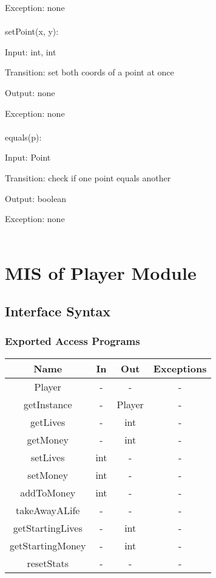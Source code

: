 \documentclass[12,english]{article}
\begin{document}
			Exception: none\\
			\\
			setPoint(x, y):
			
			Input: int, int
			
			Transition: set both coords of a point at once

			Output: none
			
			Exception: none\\
			\\
			equals(p):
			
			Input: Point
			
			Transition: check if one point equals another

			Output: boolean
			
			Exception: none\\
			\\

\section{MIS of Player Module}
		\subsection{Interface Syntax}
			\subsubsection{Exported Access Programs}
				\begin{tabular}[pos]{|c|c|c|c|}
					
					\hline
					\textbf{Name}& \textbf{In} & \textbf{Out} & \textbf{Exceptions} \\ \hline
					Player & - & - & -\\ \hline
					getInstance & - & Player & -\\ \hline
					getLives & - & int & -\\ \hline
					getMoney & - & int & -\\ \hline
					setLives & int & - & -\\ \hline
					setMoney & int & - & - \\ \hline
					addToMoney & int & - & - \\ \hline
					takeAwayALife & - & - & - \\ \hline
					getStartingLives & - & int & - \\ \hline
					getStartingMoney & - & int & - \\ \hline
					resetStats & - & - & - \\ \hline
					
				\end{tabular}
				
\end{document}
